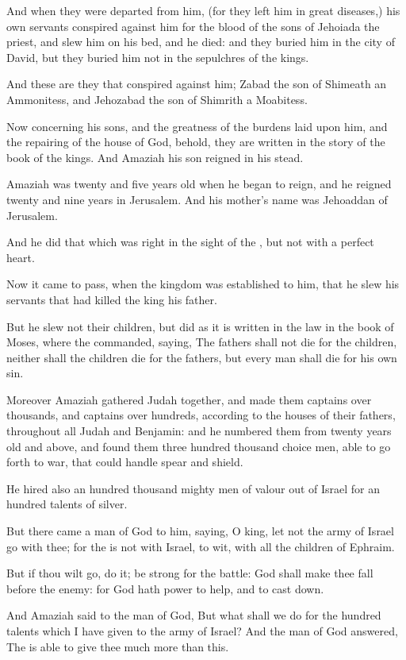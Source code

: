 \Verse And when they were departed from him, (for they left him in great diseases,) his own servants conspired against him for the blood of the sons of Jehoiada the priest, and slew him on his bed, and he died: and they buried him in the city of David, but they buried him not in the sepulchres of the kings.

\Verse And these are they that conspired against him; Zabad the son of Shimeath an Ammonitess, and Jehozabad the son of Shimrith a Moabitess.

\Verse Now concerning his sons, and the greatness of the burdens laid upon him, and the repairing of the house of God, behold, they are written in the story of the book of the kings. And Amaziah his son reigned in his stead.


\Chapter
\Verse Amaziah was twenty and five years old when he began to reign, and he reigned twenty and nine years in Jerusalem. And his mother's name was Jehoaddan of Jerusalem.

\Verse And he did that which was right in the sight of the \LORD, but not with a perfect heart.

\Verse Now it came to pass, when the kingdom was established to him, that he slew his servants that had killed the king his father.

\Verse But he slew not their children, but did as it is written in the law in the book of Moses, where the \LORD commanded, saying, The fathers shall not die for the children, neither shall the children die for the fathers, but every man shall die for his own sin.

\Verse Moreover Amaziah gathered Judah together, and made them captains over thousands, and captains over hundreds, according to the houses of their fathers, throughout all Judah and Benjamin: and he numbered them from twenty years old and above, and found them three hundred thousand choice men, able to go forth to war, that could handle spear and shield.

\Verse He hired also an hundred thousand mighty men of valour out of Israel for an hundred talents of silver.

\Verse But there came a man of God to him, saying, O king, let not the army of Israel go with thee; for the \LORD is not with Israel, to wit, with all the children of Ephraim.

\Verse But if thou wilt go, do it; be strong for the battle: God shall make thee fall before the enemy: for God hath power to help, and to cast down.

\Verse And Amaziah said to the man of God, But what shall we do for the hundred talents which I have given to the army of Israel? And the man of God answered, The \LORD is able to give thee much more than this.

